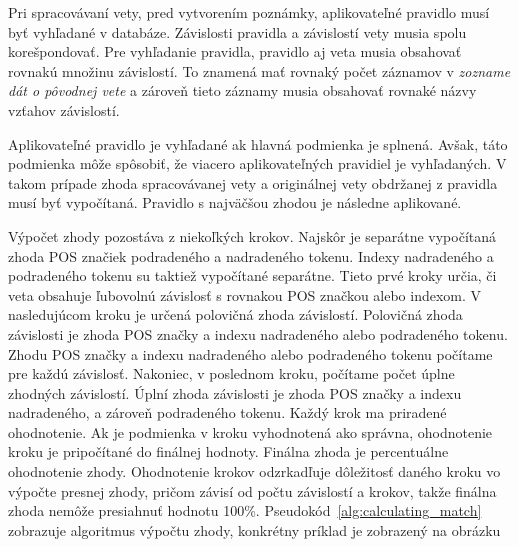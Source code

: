 \label{subsubsection:rule_lookup}
Pri spracovávaní vety, pred vytvorením poznámky, aplikovateľné pravidlo musí byť vyhľadané v databáze. Závislosti pravidla a závislostí vety musia spolu korešpondovať. Pre vyhľadanie pravidla, pravidlo aj veta musia obsahovať rovnakú množinu závislostí. To znamená mať rovnaký počet záznamov v \textit{zozname dát o pôvodnej vete} a zároveň tieto záznamy musia obsahovať rovnaké názvy vzťahov závislostí.

Aplikovateľné pravidlo je vyhľadané ak hlavná podmienka je splnená. Avšak, táto podmienka môže spôsobiť, že viacero aplikovateľných pravidiel je vyhľadaných. V takom prípade zhoda spracovávanej vety a originálnej vety obdržanej z pravidla musí byť vypočítaná. Pravidlo s najväčšou zhodou je následne aplikované.

Výpočet zhody pozostáva z niekoľkých krokov. Najskôr je separátne vypočítaná zhoda POS značiek podradeného a nadradeného tokenu. Indexy nadradeného a podradeného tokenu su taktiež vypočítané separátne. Tieto prvé kroky určia, či veta obsahuje ľubovolnú závislosť s rovnakou POS značkou alebo indexom. V nasledujúcom kroku je určená polovičná zhoda závislostí. Polovičná zhoda závislosti je zhoda POS značky a indexu nadradeného alebo podradeného tokenu. Zhodu POS značky a indexu nadradeného alebo podradeného tokenu počítame pre každú závislosť. Nakoniec, v poslednom kroku, počítame počet úplne zhodných závislostí. Úplní zhoda závislosti je zhoda POS značky a indexu nadradeného, a zároveň podradeného tokenu. Každý krok ma priradené ohodnotenie. Ak je podmienka v kroku vyhodnotená ako správna, ohodnotenie kroku je pripočítané do finálnej hodnoty. Finálna zhoda je percentuálne ohodnotenie zhody. Ohodnotenie krokov odzrkadľuje dôležitosť daného kroku vo výpočte presnej zhody, pričom závisí od počtu závislostí a krokov, takže finálna zhoda nemôže presiahnuť hodnotu 100\%. Pseudokód~\ref{alg:calculating_match} zobrazuje algoritmus výpočtu zhody, konkrétny príklad je zobrazený na obrázku~

